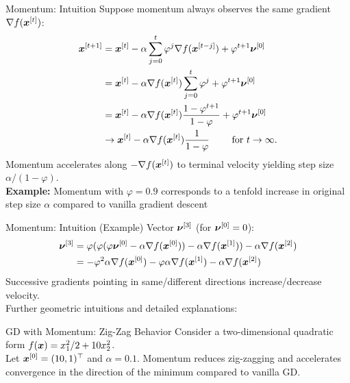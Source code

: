 \documentclass[11pt,compress,t,notes=noshow, xcolor=table]{beamer}
\begin{document}
\begin{framev}[fs=small]{Momentum: Intuition}
Suppose momentum always observes the same gradient $\nabla f(\bm{x}^{[t]})$:
\begin{align*}
\bm{x}^{[t+1]} &= \bm{x}^{[t]} - \alpha \displaystyle\sum_{j = 0}^{t} \varphi^j  \nabla f(\bm{x}^{[t-j]}) + \varphi^{t+1}\bm{\nu}^{[0]} \\
&= \bm{x}^{[t]} - \alpha  \nabla f(\bm{x}^{[t]}) \displaystyle\sum_{j = 0}^{t} \varphi^j + \varphi^{t+1}\bm{\nu}^{[0]} \\
&= \bm{x}^{[t]} - \alpha  \nabla f(\bm{x}^{[t]}) \frac{1 - \varphi^{t+1}}{1 - \varphi} + \varphi^{t+1} \bm{\nu}^{[0]} \\
&\to \bm{x}^{[t]} - \alpha  \nabla f(\bm{x}^{[t]}) \frac{1}{1 - \varphi} \qquad \text{ for } t \to \infty.
\end{align*}
Momentum accelerates along $- \nabla f(\bm{x}^{[t]})$ to terminal velocity yielding step size $\alpha / (1 - \varphi)$.\\
\spacer
\textbf{Example:} Momentum with $\varphi = 0.9$ corresponds to a tenfold increase in original step size $\alpha$ compared to vanilla gradient descent
\end{framev}


\begin{framev}[fs=small]{Momentum: Intuition (Example)}
Vector $\bm{\nu}^{[3]}$ (for $\bm{\nu}^{[0]} = 0$):
\begin{align*}
\bm{\nu}^{[3]} &= \varphi (\varphi (\varphi \bm{\nu}^{[0]} - \alpha \nabla f(\bm{x}^{[0]})) - \alpha \nabla f(\bm{x}^{[1]})) - \alpha \nabla f(\bm{x}^{[2]}) \\
&= - \varphi^2\alpha\nabla f(\bm{x}^{[0]}) - \varphi \alpha \nabla f(\bm{x}^{[1]}) - \alpha \nabla f(\bm{x}^{[2]})
\end{align*}
\spacer
Successive gradients pointing in same/different directions increase/decrease velocity.\\
Further geometric intuitions and detailed explanations: 
\end{framev}


\begin{framev}{GD with Momentum: Zig-Zag Behavior}
Consider a two-dimensional quadratic form $f(\bm{x}) = x_1^2/2 + 10 x_2^2$.\\
\vfill
Let $\bm{x}^{[0]} = (10, 1)^\top$ and $\alpha = 0.1$.
Momentum reduces zig-zagging and accelerates convergence in the direction of the minimum compared to vanilla GD.
\end{framev}
\end{document}
